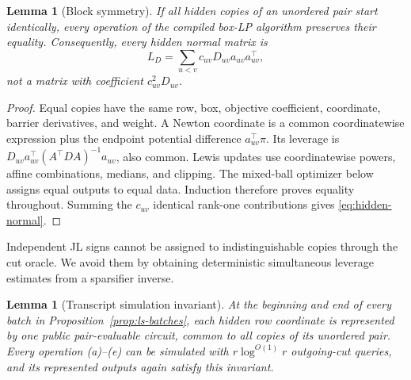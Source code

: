 \documentclass[11pt]{article}
\newtheorem{lemma}[theorem]{Lemma}
\theoremstyle{definition}
\begin{document}
\begin{lemma}[Block symmetry]\label{lem:block-symmetry}
If all hidden copies of an unordered pair start identically, every operation
of the compiled box-LP algorithm preserves their equality.  Consequently,
every hidden normal matrix is
\begin{equation}\label{eq:hidden-normal}
        L_D=\sum_{u<v}c_{uv}D_{uv}a_{uv}a_{uv}^\top,
\end{equation}
not a matrix with coefficient $c_{uv}^2D_{uv}$.
\end{lemma}

\begin{proof}
Equal copies have the same row, box, objective coefficient, coordinate,
barrier derivatives, and weight.  A Newton coordinate is a common
coordinatewise expression plus the endpoint potential difference
$a_{uv}^\top\pi$.  Its leverage is
$D_{uv}a_{uv}^\top(A^\top DA)^{-1}a_{uv}$, also common.  Lewis updates use
coordinatewise powers, affine combinations, medians, and clipping.  The
mixed-ball optimizer below assigns equal outputs to equal data.  Induction
therefore proves equality throughout.  Summing the $c_{uv}$ identical
rank-one contributions gives \eqref{eq:hidden-normal}.
\end{proof}

Independent JL signs cannot be assigned to indistinguishable copies through
the cut oracle.  We avoid them by obtaining deterministic simultaneous
leverage estimates from a sparsifier inverse.

\begin{lemma}[Transcript simulation invariant]\label{lem:transcript-simulation}
At the beginning and end of every batch in
Proposition~\ref{prop:ls-batches}, each hidden row coordinate is represented
by one public pair-evaluable circuit, common to all copies of its unordered
pair.  Every operation (a)--(e) can be simulated with
$r\log^{O(1)}r$ outgoing-cut queries, and its represented outputs again satisfy
this invariant.
\end{lemma}
\end{document}
